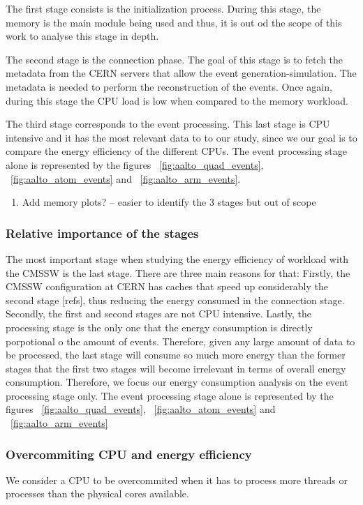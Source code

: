 The first stage consists is the initialization process. During this stage, the memory is the main module being used and thus, it is out od the scope of this work to analyse this stage in depth. 

The second stage is the connection phase. The goal of this stage is to fetch the metadata from
the CERN servers that allow the event generation-simulation. The metadata is needed to perform the reconstruction of the events. Once again, 
during this stage the CPU load is low when compared to the memory workload. 

The third stage corresponds to the event processing. This last stage is CPU intensive and it has the most relevant data to to our study, since we our goal is to compare the energy efficiency of the different CPUs. The event processing stage alone is represented by 
the figures ~\ref{fig:aalto_quad_events}, ~\ref{fig:aalto_atom_events} and ~\ref{fig:aalto_arm_events}.

\begin{enumerate}
\item Add memory plots? -- easier to identify the 3 stages but out of scope
\end{enumerate}


\subsubsection*{Relative importance of the stages}
The most important stage when studying the energy efficiency of
workload with the CMSSW is the last stage. There are three main reasons for that: Firstly, the CMSSW configuration at CERN has caches that speed up considerably the second stage [refs], thus reducing the energy consumed in the connection stage.
Secondly, the first and second stages are not CPU intensive.
Lastly, the processing stage is the only one that the energy consumption is directly porpotional o the amount of events. Therefore, given any large amount of
data to be processed, the last stage will consume so much more energy than the former stages that the first two stages will become irrelevant in terms of overall energy consumption. Therefore, we focus our energy consumption analysis on the event processing stage only. The event processing stage alone is represented by the figures ~\ref{fig:aalto_quad_events}, ~\ref{fig:aalto_atom_events} and ~\ref{fig:aalto_arm_events}


\subsubsection*{Overcommiting CPU and energy efficiency}
We consider a CPU to be overcommited when it has to process more threads or processes than the physical cores available.

